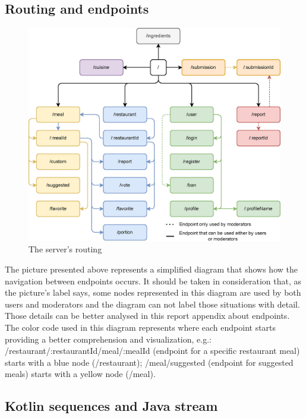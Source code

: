\subsection{Routing and endpoints}

\begin{figure}[H]
    \begin{center}
        \includegraphics[scale=0.8]{_figures/endpoints_diagram.eps}
        \caption{The server's routing}
    \end{center}
\end{figure}

The picture presented above represents a simplified diagram that shows how the navigation between endpoints occurs.
It should be taken in consideration that, as the picture's label says, some nodes represented in this diagram are used by 
both users and moderators and the diagram can not label those situations with detail. Those details can be better analysed
in this report appendix about endpoints.\\

The color code used in this diagram represents where each endpoint starts providing a better comprehension
and visualization, e.g.: /restaurant/:restaurantId/meal/:mealId (endpoint for a specific restaurant meal) starts with a blue
node (/restaurant); /meal/suggested (endpoint for suggested meals) starts with a yellow node (/meal).\\

\subsection{Kotlin sequences and Java stream}

